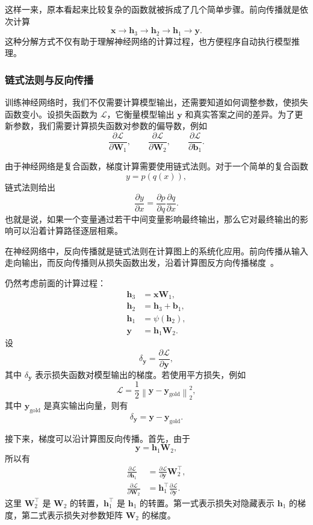 这样一来，原本看起来比较复杂的函数就被拆成了几个简单步骤。前向传播就是依次计算
\[
\mathbf{x}
\rightarrow
\mathbf{h}_3
\rightarrow
\mathbf{h}_2
\rightarrow
\mathbf{h}_1
\rightarrow
\mathbf{y}.
\]
这种分解方式不仅有助于理解神经网络的计算过程，也方便程序自动执行模型推理。

\subsubsection{链式法则与反向传播}

训练神经网络时，我们不仅需要计算模型输出，还需要知道如何调整参数，使损失函数变小。设损失函数为 $\mathcal{L}$，它衡量模型输出 $\mathbf{y}$ 和真实答案之间的差异。为了更新参数，我们需要计算损失函数对参数的偏导数，例如
\[
\frac{\partial \mathcal{L}}{\partial \mathbf{W}_1},
\qquad
\frac{\partial \mathcal{L}}{\partial \mathbf{W}_2},
\qquad
\frac{\partial \mathcal{L}}{\partial \mathbf{b}_1}.
\]

由于神经网络是复合函数，梯度计算需要使用链式法则。对于一个简单的复合函数
\[
y=p(q(x)),
\]
链式法则给出
\[
\frac{\partial y}{\partial x}
=
\frac{\partial p}{\partial q}
\frac{\partial q}{\partial x}.
\]
也就是说，如果一个变量通过若干中间变量影响最终输出，那么它对最终输出的影响可以沿着计算路径逐层相乘。

在神经网络中，反向传播就是链式法则在计算图上的系统化应用。前向传播从输入走向输出，而反向传播则从损失函数出发，沿着计算图反方向传播梯度~\cite{RumelhartEtAl1986Backprop,GoodfellowEtAl2016DeepLearning}。

仍然考虑前面的计算过程：
\begin{align}
  \mathbf{h}_3 &= \mathbf{x}\mathbf{W}_1,\\
  \mathbf{h}_2 &= \mathbf{h}_3+\mathbf{b}_1,\\
  \mathbf{h}_1 &= \psi(\mathbf{h}_2),\\
  \mathbf{y} &= \mathbf{h}_1\mathbf{W}_2.
\end{align}
设
\[
\delta_{\mathbf{y}}
=
\frac{\partial \mathcal{L}}{\partial \mathbf{y}},
\]
其中 $\delta_{\mathbf{y}}$ 表示损失函数对模型输出的梯度。若使用平方损失，例如
\[
\mathcal{L}
=
\frac{1}{2}
\left\|
\mathbf{y}
-
\mathbf{y}_{\mathrm{gold}}
\right\|_2^2,
\]
其中 $\mathbf{y}_{\mathrm{gold}}$ 是真实输出向量，则有
\[
\delta_{\mathbf{y}}
=
\mathbf{y}
-
\mathbf{y}_{\mathrm{gold}}.
\]

接下来，梯度可以沿计算图反向传播。首先，由于
\[
\mathbf{y}=\mathbf{h}_1\mathbf{W}_2,
\]
所以有
\begin{align}
  \frac{\partial \mathcal{L}}{\partial \mathbf{h}_1}
  &=
  \frac{\partial \mathcal{L}}{\partial \mathbf{y}}
  \mathbf{W}_2^{\top},\\
  \frac{\partial \mathcal{L}}{\partial \mathbf{W}_2}
  &=
  \mathbf{h}_1^{\top}
  \frac{\partial \mathcal{L}}{\partial \mathbf{y}}.
\end{align}
这里 $\mathbf{W}_2^{\top}$ 是 $\mathbf{W}_2$ 的转置，$\mathbf{h}_1^{\top}$ 是 $\mathbf{h}_1$ 的转置。第一式表示损失对隐藏表示 $\mathbf{h}_1$ 的梯度，第二式表示损失对参数矩阵 $\mathbf{W}_2$ 的梯度。

